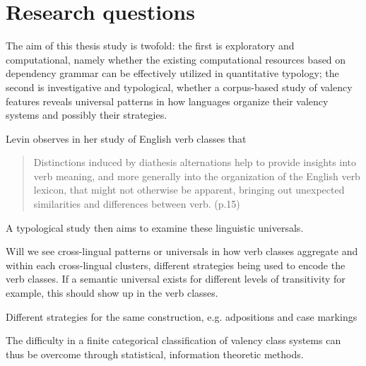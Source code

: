 \section{Research questions}\label{sec:rqs}

The aim of this thesis study is twofold: the first is exploratory and computational, namely whether the existing computational resources based on dependency grammar can be effectively utilized in quantitative typology; the second is investigative and typological, whether a corpus-based study of valency features reveals universal patterns in how languages organize their valency systems and possibly their strategies.


\citet{levin1993} Levin observes in her study of English verb classes that
\begin{quote}
    Distinctions induced by diathesis alternations help to provide insights into verb meaning, and more generally into the organization of the English verb lexicon, that might not otherwise be apparent, bringing out unexpected similarities and differences between verb. (p.15)
\end{quote}

A typological study then aims to examine these linguistic universals.

Will we see cross-lingual patterns or universals in how verb classes aggregate and within each cross-lingual clusters, different strategies being used to encode the verb classes. If a semantic universal exists for different levels of transitivity for example, this should show up in the verb classes.

Different strategies for the same construction, e.g. adpositions and case markings


The difficulty in a finite categorical classification of valency class systems can thus be overcome through statistical, information theoretic methods.
